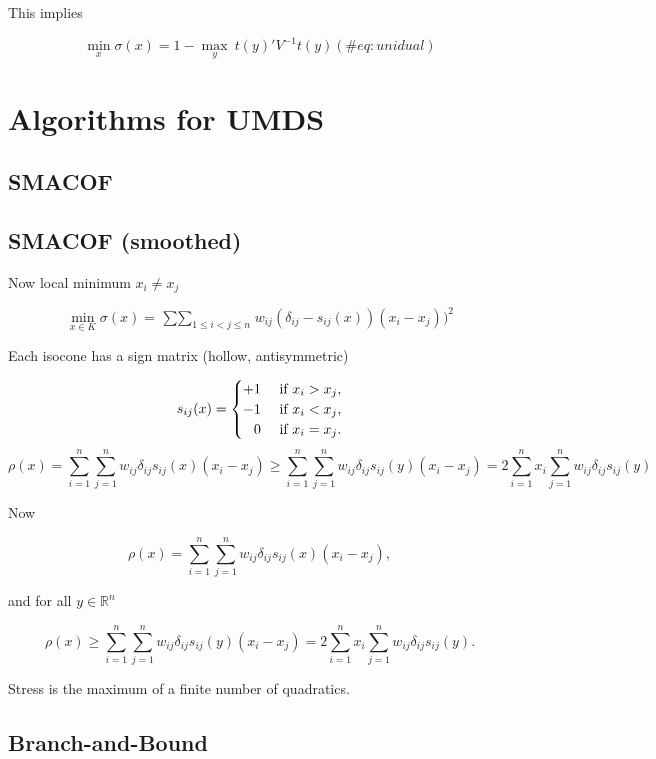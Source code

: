 \documentclass[
  12pt,
  letterpaper,
  DIV=11,
  numbers=noendperiod]{scrreprt}
\theoremstyle{remark}
\begin{document}
This implies

\begin{equation}
\min_x\sigma(x)= 1 - \max_y\ t(y)'V^{-1}t(y)
(\#eq:unidual)
\end{equation}

\section{Algorithms for UMDS}\label{unialgorithms}

\subsection{SMACOF}\label{unismacof}

\subsection{SMACOF (smoothed)}\label{unismoothed}

Now local minimum \(x_i\not= x_j\)

\[
\min_{x\in K}\sigma(x)=\mathop{\sum\sum}_{1\leq i<j\leq n}w_{ij}(\delta_{ij}-s_{ij}(x))(x_i-x_j))^2
\]

Each isocone has a sign matrix (hollow, antisymmetric)

\[
s_{ij}(x)=\begin{cases}+1&\text{ if }x_i>x_j,\\
-1&\text{ if }x_i<x_j,\\
\hfill 0&\text{ if }x_i=x_j.
\end{cases}
\] \[
\rho(x)=\sum_{i=1}^n\sum_{j=1}^nw_{ij}\delta_{ij}s_{ij}(x)(x_i-x_j)\geq
\sum_{i=1}^n\sum_{j=1}^nw_{ij}\delta_{ij}s_{ij}(y)(x_i-x_j)=
2\sum_{i=1}^n x_i\sum_{j=1}^n w_{ij}\delta_{ij}s_{ij}(y)
\]

Now

\begin{equation}
\rho(x)=\sum_{i=1}^n\sum_{j=1}^nw_{ij}\delta_{ij}s_{ij}(x)(x_i-x_j),
\end{equation}

and for all \(y\in\mathbb{R}^n\)

\begin{equation}
\rho(x)\geq
\sum_{i=1}^n\sum_{j=1}^nw_{ij}\delta_{ij}s_{ij}(y)(x_i-x_j)=
2\sum_{i=1}^n x_i\sum_{j=1}^n w_{ij}\delta_{ij}s_{ij}(y).
\end{equation}

Stress is the maximum of a finite number of quadratics.

\subsection{Branch-and-Bound}\label{unibranchbound}
\end{document}
